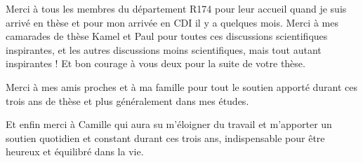 Merci à tous les membres du département R174 pour leur accueil quand je suis arrivé en thèse et pour mon arrivée en CDI il y a quelques mois. 
Merci à mes camarades de thèse Kamel et Paul pour toutes ces discussions scientifiques inspirantes, et les autres discussions moins scientifiques, mais tout autant inspirantes ! Et bon courage à vous deux pour la suite de  votre thèse. 

Merci à mes amis proches et à ma famille pour tout le soutien apporté durant ces trois ans de thèse et plus généralement dans mes études. 

Et enfin merci à Camille qui aura su m'éloigner du travail et m'apporter un soutien quotidien et constant durant ces trois ans, indispensable pour être heureux et équilibré dans la vie.  

\newpage